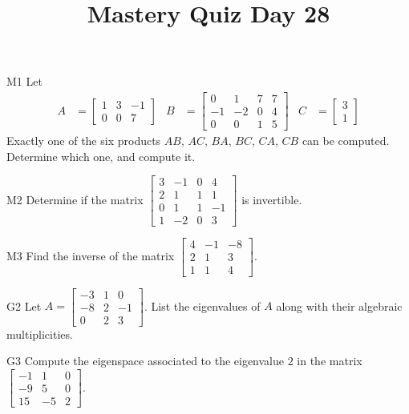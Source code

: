 \documentclass{sbgLAquiz}
\title{Mastery Quiz Day 28 }
\begin{document}
\begin{problem}{M1}
Let
\begin{align*}
A &= \begin{bmatrix} 1 & 3 & -1  \\ 0 & 0 & 7  \end{bmatrix} & B &= \begin{bmatrix} 0 & 1 & 7 & 7 \\ -1 & -2 & 0 & 4 \\ 0 & 0 & 1 & 5 \end{bmatrix} & C&=\begin{bmatrix} 3  \\  1 \end{bmatrix}
\end{align*}
Exactly one of the six products $AB$, $AC$, $BA$, $BC$, $CA$, $CB$ can be computed.  Determine which one, and compute it.
\end{problem}

\begin{problem}{M2}
Determine if the matrix $\begin{bmatrix} 3 & -1 & 0 & 4 \\ 2 & 1 & 1 & 1 \\ 0 & 1 & 1 & -1 \\ 1 & -2 & 0 & 3 \end{bmatrix}$ is invertible.
\end{problem}
\newpage

\begin{problem}{M3}
  Find the inverse of the matrix
  \(\begin{bmatrix}
    4 & -1 & -8  \\
    2 & 1 & 3  \\
    1 & 1 & 4
  \end{bmatrix}\).
\end{problem}

\begin{problem}{G2}
Let $A= \begin{bmatrix}-3 & 1 & 0 \\ -8 & 2 & -1 \\ 0 & 2 & 3\end{bmatrix}$.
List the eigenvalues of $A$ along with their algebraic multiplicities.
\end{problem}
\newpage

\begin{problem}{G3}
Compute the eigenspace associated to the eigenvalue $2$ in the matrix $\begin{bmatrix} -1 & 1 & 0 \\ -9 & 5 & 0 \\ 15 & -5 & 2 \end{bmatrix}$.
\end{problem}
\end{document}
